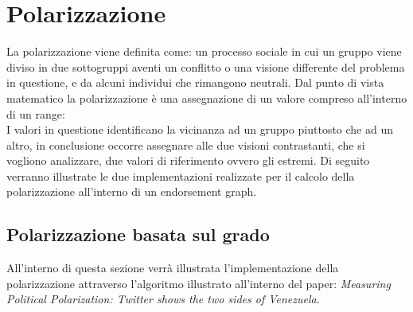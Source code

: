 \section{Polarizzazione}
\label{Polarizzazione}
La polarizzazione viene definita come: 
un processo sociale in cui un gruppo viene diviso in due sottogruppi aventi un conflitto o una visione differente del problema in questione, e da alcuni individui che rimangono neutrali.
Dal punto di vista matematico la polarizzazione è una assegnazione di un valore compreso all'interno di un range:
\begin{equation}
[-1,1]
\end{equation}
I valori in questione identificano la vicinanza ad un gruppo piuttosto che ad un altro, in conclusione occorre assegnare alle due visioni contrastanti, che si vogliono analizzare, due valori di riferimento ovvero gli estremi.
Di seguito verranno illustrate le due implementazioni realizzate per il calcolo della polarizzazione all'interno di un endorsement graph.

\subsection{Polarizzazione basata sul grado}
All'interno di questa sezione verrà illustrata l'implementazione della polarizzazione attraverso l'algoritmo illustrato all'interno del paper: \textit{Measuring Political Polarization: Twitter shows the two sides of Venezuela}.

